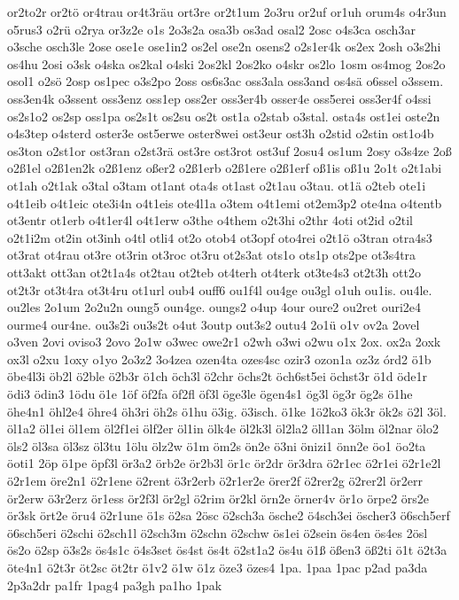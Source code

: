 {or2to2r
or2tö
or4trau
or4t3räu
ort3re
or2t1um
2o3ru
or2uf
or1uh
orum4s
o4r3un
o5rus3
o2rü
o2rya
or3z2e
o1s
2o3s2a
osa3b
os3ad
osal2
2osc
o4s3ca
osch3ar
o3sche
osch3le
2ose
ose1e
ose1in2
os2el
ose2n
osens2
o2s1er4k
os2ex
2osh
o3s2hi
os4hu
2osi
o3sk
o4ska
os2kal
o4ski
2os2kl
2os2ko
o4skr
os2lo
1osm
os4mog
2os2o
osol1
o2sö
2osp
os1pec
o3s2po
2oss
os6s3ac
oss3ala
oss3and
os4sä
o6ssel
o3ssem.
oss3en4k
o3ssent
oss3enz
oss1ep
oss2er
oss3er4b
osser4e
oss5erei
oss3er4f
o4ssi
os2s1o2
os2sp
oss1pa
os2s1t
os2su
os2t
ost1a
o2stab
o3stal.
osta4s
ost1ei
oste2n
o4s3tep
o4sterd
oster3e
ost5erwe
oster8wei
ost3eur
ost3h
o2stid
o2stin
ost1o4b
os3ton
o2st1or
ost3ran
o2st3rä
ost3re
ost3rot
ost3uf
2osu4
os1um
2osy
o3s4ze
2oß
o2ß1el
o2ß1en2k
o2ß1enz
oßer2
o2ß1erb
o2ß1ere
o2ß1erf
oß1is
oß1u
2o1t
o2t1abi
ot1ah
o2t1ak
o3tal
o3tam
ot1ant
ota4s
ot1ast
o2t1au
o3tau.
ot1ä
o2teb
ote1i
o4t1eib
o4t1eic
ote3i4n
o4t1eis
ote4l1a
o3tem
o4t1emi
ot2em3p2
ote4na
o4tentb
ot3entr
ot1erb
o4t1er4l
o4t1erw
o3the
o4them
o2t3hi
o2thr
4oti
ot2id
o2til
o2t1i2m
ot2in
ot3inh
o4tl
otli4
ot2o
otob4
ot3opf
oto4rei
o2t1ö
o3tran
otra4s3
ot3rat
ot4rau
ot3re
ot3rin
ot3roc
ot3ru
ot2s3at
ots1o
ots1p
ots2pe
ot3s4tra
ott3akt
ott3an
ot2t1a4s
ot2tau
ot2teb
ot4terh
ot4terk
ot3te4s3
ot2t3h
ott2o
ot2t3r
ot3t4ra
ot3t4ru
ot1url
oub4
ouff6
ou1f4l
ou4ge
ou3gl
o1uh
ou1is.
ou4le.
ou2les
2o1um
2o2u2n
oung5
oun4ge.
oungs2
o4up
4our
oure2
ou2ret
ouri2e4
ourme4
our4ne.
ou3s2i
ou3s2t
o4ut
3outp
out3s2
outu4
2o1ü
o1v
ov2a
2ovel
o3ven
2ovi
oviso3
2ovo
2o1w
o3wec
owe2r1
o2wh
o3wi
o2wu
o1x
2ox.
ox2a
2oxk
ox3l
o2xu
1oxy
o1yo
2o3z2
3o4zea
ozen4ta
ozes4sc
ozir3
ozon1a
oz3z
órd2
ö1b
öbe4l3i
öb2l
ö2ble
ö2b3r
ö1ch
öch3l
ö2chr
öchs2t
öch6st5ei
öchst3r
ö1d
öde1r
ödi3
ödin3
1ödu
ö1e
1öf
öf2fa
öf2fl
öf3l
öge3le
ögen4s1
ög3l
ög3r
ög2s
ö1he
öhe4n1
öhl2e4
öhre4
öh3ri
öh2s
ö1hu
ö3ig.
ö3isch.
ö1ke
1ö2ko3
ök3r
ök2s
ö2l
3öl.
öl1a2
öl1ei
öl1em
öl2f1ei
ölf2er
öl1in
ölk4e
öl2k3l
öl2la2
öll1an
3ölm
öl2nar
ölo2
öls2
öl3sa
öl3sz
öl3tu
1ölu
ölz2w
ö1m
öm2s
ön2e
ö3ni
önizi1
önn2e
öo1
öo2ta
öoti1
2öp
ö1pe
öpf3l
ör3a2
örb2e
ör2b3l
ör1c
ör2dr
ör3dra
ö2r1ec
ö2r1ei
ö2r1e2l
ö2r1em
öre2n1
ö2r1ene
ö2rent
ö3r2erb
ö2r1er2e
örer2f
ö2rer2g
ö2rer2l
ör2err
ör2erw
ö3r2erz
ör1ess
ör2f3l
ör2gl
ö2rim
ör2kl
örn2e
örner4v
ör1o
örpe2
örs2e
ör3sk
ört2e
öru4
ö2r1une
ö1s
ö2sa
2ösc
ö2sch3a
ösche2
ö4sch3ei
öscher3
ö6sch5erf
ö6sch5eri
ö2schi
ö2sch1l
ö2sch3m
ö2schn
ö2schw
ös1ei
ö2sein
ös4en
ös4es
2ösl
ös2o
ö2sp
ö3s2s
ös4s1c
ö4s3set
ös4st
ös4t
ö2st1a2
ös4u
ö1ß
ößen3
öß2ti
ö1t
ö2t3a
öte4n1
ö2t3r
öt2sc
öt2tr
ö1v2
ö1w
ö1z
öze3
özes4
1pa.
1paa
1pac
p2ad
pa3da
2p3a2dr
pa1fr
1pag4
pa3gh
pa1ho
1pak
}

